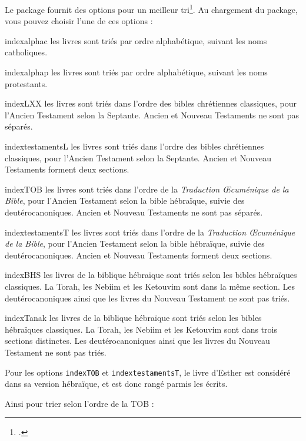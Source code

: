 Le package fournit des options pour un meilleur tri\footcite[Pour l'Ancien Testament, les protestants suivent le canon juif pour son contenu mais utilisent l'ordre du canon catholique : voir][]{canons}. Au chargement du package, vous pouvez choisir l'une de ces options :
 \begin{choix}
 \item[indexalphac] les livres sont triés par ordre alphabétique, suivant les noms catholiques.
\item[indexalphap] les livres sont triés par ordre alphabétique, suivant les noms protestants.
\item[indexLXX]les livres sont triés dans l'ordre des bibles chrétiennes classiques, pour l'Ancien Testament  selon la Septante. Ancien et Nouveau Testaments ne sont pas séparés.
\item[indextestamentsL] les livres sont triés dans l'ordre des bibles chrétiennes classiques, pour l'Ancien Testament  selon la Septante. Ancien et Nouveau Testaments forment deux sections.
\item[indexTOB] les livres sont triés dans l'ordre de la \emph{Traduction Œcuménique de la Bible}, pour l'Ancien Testament  selon la bible hébraïque, suivie des deutérocanoniques. Ancien et Nouveau Testaments ne sont pas séparés.
\item[indextestamentsT] les livres sont triés dans l'ordre de la \emph{Traduction Œcuménique de la Bible}, pour l'Ancien Testament  selon la bible hébraïque, suivie des deutérocanoniques. Ancien et Nouveau Testaments forment deux sections.
\item[indexBHS] les livres de la biblique hébraïque sont triés selon les bibles hébraïques classiques. La Torah, les Nebiim et les Ketouvim sont dans la même section. Les deutérocanoniques ainsi que les livres du Nouveau Testament ne sont pas triés.
\item[indexTanak] les livres de la biblique hébraïque sont triés selon les bibles hébraïques classiques. La Torah, les Nebiim et les Ketouvim sont dans trois sections distinctes. Les deutérocanoniques ainsi que les livres du Nouveau Testament ne sont pas triés.
\end{choix}

Pour les options \verb|indexTOB| et \verb|indextestamentsT|, le livre d'Esther est considéré dans sa version hébraïque, et est donc rangé parmis les  écrits.

Ainsi pour trier selon l'ordre de la TOB : 

\begin{latexcode}
\usepackage[indexTOB]{bibleref-french}
\end{latexcode}


